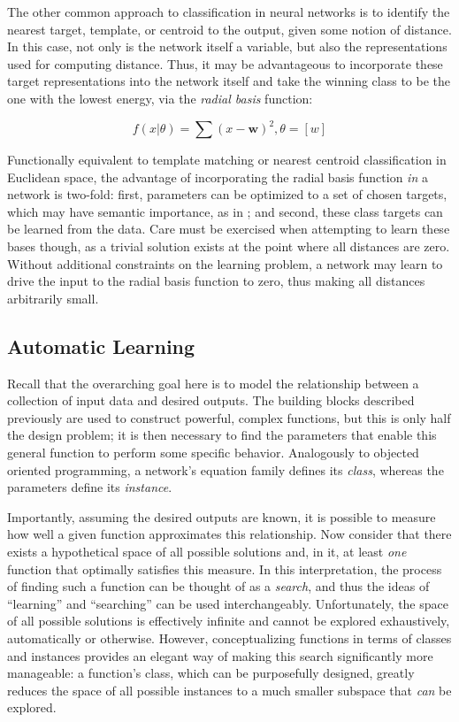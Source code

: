 The other common approach to classification in neural networks is to identify the nearest target, template, or centroid to the output, given some notion of distance.
In this case, not only is the network itself a variable, but also the representations used for computing distance.
Thus, it may be advantageous to incorporate these target representations into the network itself and take the winning class to be the one with the lowest energy, via the \emph{radial basis} function:

\begin{equation}
f(x | \theta) = \sum(x - \mathbf{w})^2, \theta = [w]
\end{equation}

\noindent Functionally equivalent to template matching or nearest centroid classification in Euclidean space, the advantage of incorporating the radial basis function \emph{in} a network is two-fold:
first, parameters can be optimized to a set of chosen targets, which may have semantic importance, as in \cite{LeCun1998};
and second, these class targets can be learned from the data.
Care must be exercised when attempting to learn these bases though, as a trivial solution exists at the point where all distances are zero.
Without additional constraints on the learning problem, a network may learn to drive the input to the radial basis function to zero, thus making all distances arbitrarily small.


\subsection{Automatic Learning}
\label{subsec:learning}

Recall that the overarching goal here is to model the relationship between a collection of input data and desired outputs.
The building blocks described previously are used to construct powerful, complex functions, but this is only half the design problem;
it is then necessary to find the parameters that enable this general function to perform some specific behavior.
Analogously to objected oriented programming, a network's equation family defines its \emph{class}, whereas the parameters define its \emph{instance}.

Importantly, assuming the desired outputs are known, it is possible to measure how well a given function approximates this relationship.
Now consider that there exists a hypothetical space of all possible solutions and, in it, at least \emph{one} function that optimally satisfies this measure.
In this interpretation, the process of finding such a function can be thought of as a \emph{search}, and thus the ideas of ``learning'' and ``searching'' can be used interchangeably.
Unfortunately, the space of all possible solutions is effectively infinite and cannot be explored exhaustively, automatically or otherwise.
However, conceptualizing functions in terms of classes and instances provides an elegant way of making this search significantly more manageable:
a function's class, which can be purposefully designed, greatly reduces the space of all possible instances to a much smaller subspace that \emph{can} be explored.

